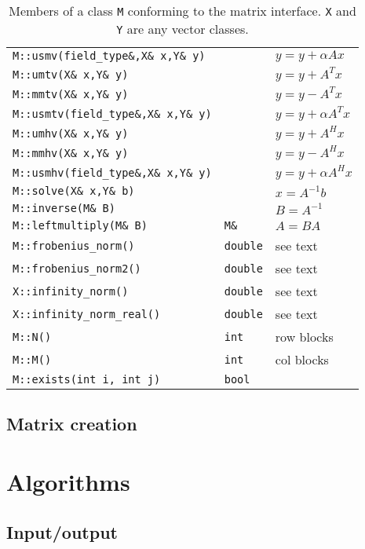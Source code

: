 \documentclass[11pt]{article}
\begin{document}
\begin{table}[htb]
\begin{center}
\begin{tabular}{|l|l|l|}
\texttt{M::usmv(field\_type\&,X\& x,Y\& y)}   &  & $y = y + \alpha Ax$\\
\texttt{M::umtv(X\& x,Y\& y)}   &  & $y = y + A^Tx$\\
\texttt{M::mmtv(X\& x,Y\& y)}   &  & $y = y - A^Tx$\\
\texttt{M::usmtv(field\_type\&,X\& x,Y\& y)}  &  & $y = y + \alpha A^Tx$\\
\texttt{M::umhv(X\& x,Y\& y)}   &  & $y = y + A^Hx$\\
\texttt{M::mmhv(X\& x,Y\& y)}   &  & $y = y - A^Hx$\\
\texttt{M::usmhv(field\_type\&,X\& x,Y\& y)}  &  & $y = y + \alpha A^Hx$\\
\hline
\texttt{M::solve(X\& x,Y\& b)}   &  & $x = A^{-1}b$\\
\texttt{M::inverse(M\& B)} & & $B=A^{-1}$\\
\texttt{M::leftmultiply(M\& B)} & \texttt{M\&} & $A = BA$\\
\hline
\texttt{M::frobenius\_norm()} & \texttt{double} & see text\\
\texttt{M::frobenius\_norm2()} & \texttt{double} &see text\\
\texttt{X::infinity\_norm()} & \texttt{double} & see text\\
\texttt{X::infinity\_norm\_real()} & \texttt{double} &see text\\
\hline
\texttt{M::N()} & \texttt{int} & row blocks\\
\texttt{M::M()} & \texttt{int} & col blocks\\
\texttt{M::exists(int i, int j)} & \texttt{bool} &\\
\hline
\end{tabular}
\end{center}

\caption{Members of a class \lstinline!M! conforming to the matrix
  interface. \lstinline!X! and \lstinline!Y! are any vector classes.}
\label{Tab:MatrixMembers}
\end{table}

\subsection{Matrix creation}

\section{Algorithms}

\subsection{Input/output}
\end{document}
